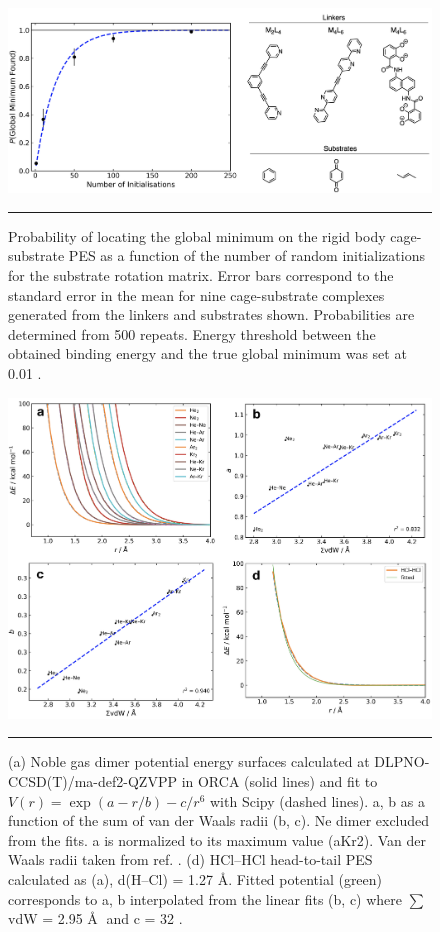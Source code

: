 \documentclass[../../main.tex]{subfiles}
\begin{document}
\begin{figure}[h!]
	\vspace{0.4cm}
	\centering
	\includegraphics[width=\textwidth]{3/cgbind/figs/figS2}
	\vspace{0.2cm}
	\hrule
	\caption{Probability of locating the global minimum on the rigid body cage-substrate PES as a function of the number of random initializations for the substrate rotation matrix. Error bars correspond to the standard error in the mean for nine cage-substrate complexes generated from the linkers and substrates shown. Probabilities are determined from 500 repeats. Energy threshold between the obtained binding energy and the true global minimum was set at 0.01 \kcal.}
	\label{fig::si_cg_2}
\end{figure}



\begin{figure}[h!]
	\vspace{0.4cm}
	\centering
	 \includegraphics[width=\textwidth]{3/cgbind/figs/figS3}
	\vspace{0.2cm}
	\hrule
	\caption{(a) Noble gas dimer potential energy surfaces calculated at DLPNO-CCSD(T)/ma-def2-QZVPP in ORCA (solid lines) and fit to $V(r) = \exp(a-r/b) - c/r^6$ with Scipy (dashed lines). a, b as a function of the sum of van der Waals radii (b, c). Ne dimer excluded from the fits. a is normalized to its maximum value (aKr2). Van der Waals radii taken from ref. \cite{Mantina2009}. (d) HCl–HCl head-to-tail PES calculated as (a), d(H–Cl) = 1.27 \AA. Fitted potential (green) corresponds to a, b interpolated from the linear fits (b, c) where $\sum$vdW = 2.95 \AA$\;$ and c = 32 \kcal.}
	\label{fig::si_cg_3}
\end{figure}
\end{document}
